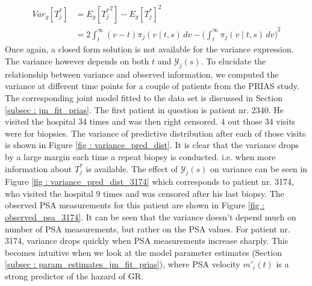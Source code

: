 \begin{equation}
\begin{split}
Var_g[T^*_j] &= E_g[{T^*_j}^2] - {E_g[T^*_j]}^2\\
&= 2 \int_t^\infty {(v-t) \pi_j(v \mid t, s) \,dv} - {\bigg(\int_t^\infty \pi_j(v \mid t, s) \,dv\bigg)}^2
\end{split}
\end{equation}
Once again, a closed form solution is not available for the variance expression. The variance however depends on both $t$ and $\mathcal{Y}_j(s)$. To elucidate the relationship between variance and observed information, we computed the variance at different time points for a couple of patients from the PRIAS study. The corresponding joint model fitted to the data set is discussed in Section \ref{subsec : jm_fit_prias}. The first patient in question is patient nr. 2340. He visited the hospital 34 times and was then right censored. 4 out those 34 visits were for biopsies. The variance of predictive distribution after each of those visits is shown in Figure \ref{fig : variance_pred_dist}. It is clear that the variance drops by a large margin each time a repeat biopsy is conducted. i.e. when more information about $T^*_j$ is available. The effect of $\mathcal{Y}_j(s)$ on variance can be seen in Figure \ref{fig : variance_pred_dist_3174} which corresponds to patient nr. 3174, who visited the hospital 9 times and was censored after his last biopsy. The observed PSA measurements for this patient are shown in Figure \ref{fig : observed_psa_3174}. It can be seen that the variance doesn't depend much on number of PSA measurements, but rather on the PSA values. For patient nr. 3174, variance drops quickly when PSA measurements increase sharply.  This becomes intuitive when we look at the model parameter estimates (Section \ref{subsec : param_estimates_jm_fit_prias}), where PSA velocity $m'_i(t)$ is a strong predictor of the hazard of GR.

